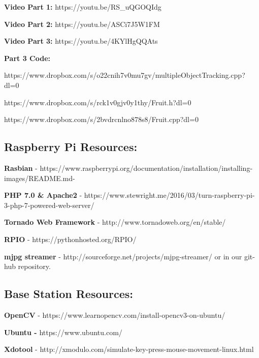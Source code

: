 \documentclass[onecolumn, draftclsnofoot,10pt, compsoc]{IEEEtran}
\begin{document}
\textbf{Video Part 1:} https://youtu.be/RS\_uQGOQIdg

\textbf{Video Part 2:} https://youtu.be/ASCi7J5W1FM

\textbf{Video Part 3:} https://youtu.be/4KYlHgQQAts

\textbf{Part 3 Code:}

https://www.dropbox.com/s/o22cnih7v0mu7gv/multipleObjectTracking.cpp?dl=0

https://www.dropbox.com/s/rck1v0gjv0y1thy/Fruit.h?dl=0

https://www.dropbox.com/s/2bvdrcnlno878s8/Fruit.cpp?dl=0

\subsection{Raspberry Pi Resources:}

\textbf{Rasbian} - https://www.raspberrypi.org/documentation/installation/installing-images/README.md-

\textbf{PHP 7.0 \& Apache2} - https://www.stewright.me/2016/03/turn-raspberry-pi-3-php-7-powered-web-server/

\textbf{Tornado Web Framework} - http://www.tornadoweb.org/en/stable/

\textbf{RPIO} - https://pythonhosted.org/RPIO/

\textbf{mjpg streamer} - http://sourceforge.net/projects/mjpg-streamer/ or in our git-hub repository.

\subsection{Base Station Resources:}

\textbf{OpenCV} - https://www.learnopencv.com/install-opencv3-on-ubuntu/

\textbf{Ubuntu - }https://www.ubuntu.com/

\textbf{Xdotool} - http://xmodulo.com/simulate-key-press-mouse-movement-linux.html


\newpage


\end{document}
